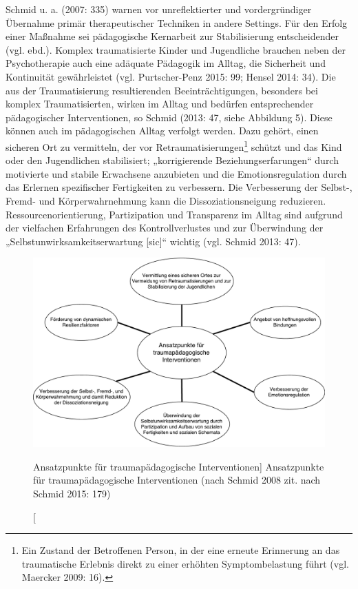 Schmid u. a. (2007: 335) warnen vor unreflektierter und vordergründiger Übernahme prim{\"a}r therapeutischer Techniken in andere Settings. F{\"u}r den Erfolg einer Maßnahme sei p{\"a}dagogische Kernarbeit zur Stabilisierung entscheidender (vgl. ebd.). Komplex traumatisierte Kinder und Jugendliche brauchen neben der Psychotherapie auch eine adäquate Pädagogik im Alltag, die Sicherheit und Kontinuität gewährleistet (vgl. Purtscher-Penz 2015: 99; Hensel 2014: 34). Die aus der Traumatisierung resultierenden Beeinträchtigungen, besonders bei komplex Traumatisierten, wirken im Alltag und bedürfen entsprechender pädagogischer Interventionen, so Schmid (2013: 47, siehe Abbildung 5). Diese können auch im pädagogischen Alltag verfolgt werden. Dazu gehört, einen sicheren Ort zu vermitteln, der vor Retraumatisierungen\footnote{Ein Zustand der Betroffenen Person, in der eine erneute Erinnerung an das traumatische Erlebnis direkt zu einer erh{\"o}hten Symptombelastung f{\"u}hrt (vgl. Maercker 2009: 16).} schützt und das Kind oder den Jugendlichen stabilisiert; „korrigierende Beziehungserfarungen“ durch motivierte und stabile Erwachsene anzubieten und die Emotionsregulation durch das Erlernen spezifischer Fertigkeiten zu verbessern. Die Verbesserung der Selbst-, Fremd- und Körperwahrnehmung kann die Dissoziationsneigung reduzieren. Ressourcenorientierung, Partizipation und Transparenz im Alltag sind aufgrund der vielfachen Erfahrungen des Kontrollverlustes und zur Überwindung der „Selbstunwirksamkeitserwartung [sic]“ wichtig (vgl. Schmid 2013: 47).

\begin{figure}[h]
  \centering
  \includegraphics[scale=0.5]{abbildung5}
  \caption
      [Ansatzpunkte für traumapädagogische Interventionen]
      {Ansatzpunkte für traumapädagogische Interventionen (nach Schmid 2008 zit. nach Schmid 2015: 179)}
  \label{fig:ansatzpunkte}
\end{figure}

